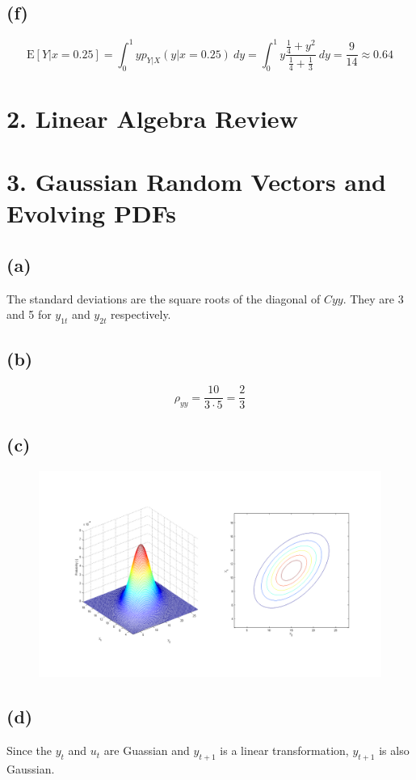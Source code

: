 \documentclass[fleqn, letterpaper]{tufte-handout}
\newcommand{\E}{\text{E}}
\begin{document}
\subsection{(f)}
\[
        \E[Y|x=0.25]
        = \int_0^1 yp_{Y|X}(y|x = 0.25)\ dy
        = \int_0^1 y\frac{\frac{1}{4}+y^2}{\frac{1}{4}+\frac{1}{3}}\ dy
        = \frac{9}{14} \approx 0.64
\]
\section{2. Linear Algebra Review}
\section{3. Gaussian Random Vectors and Evolving PDFs}
\subsection{(a)}
The standard deviations are the square roots of the diagonal of $Cyy$. They are 3 and 5 for $y_{1t}$ and $y_{2t}$ respectively.
\subsection{(b)}
\[
        \rho_{yy} = \frac{10}{3\cdot5} = \frac{2}{3}
\]
\subsection{(c)}
\begin{figure}[h!]
        \includegraphics[width=\textwidth]{ps2plot}
\end{figure}
\subsection{(d)}
Since the $y_t$ and $u_t$ are Guassian and $y_{t+1}$ is a linear transformation, $y_{t+1}$ is also Gaussian.
\end{document}
